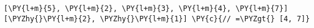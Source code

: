 \begin{Verbatim}[commandchars=\\\{\}]
[\PY{l+m}{5}, \PY{l+m}{2}, \PY{l+m}{3}, \PY{l+m}{4}, \PY{l+m}{7}][\PYZhy{}\PY{l+m}{2}, \PYZhy{}\PY{l+m}{1}] \PY{c}{// =\PYZgt{} [4, 7]}
\end{Verbatim}

